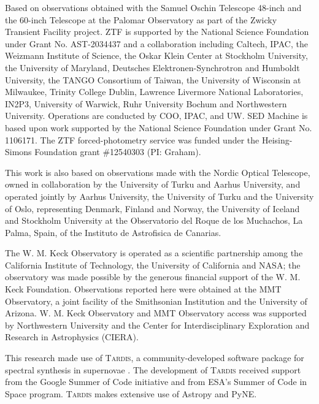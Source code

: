\documentclass[twocolumn]{aastex631}
\begin{document}
\begin{CJK*}{UTF8}{gbsn}
Based on observations obtained with the Samuel Oschin Telescope 48-inch and the 60-inch Telescope at the Palomar Observatory as part of the Zwicky Transient Facility project. ZTF is supported by the National Science Foundation under Grant No. AST-2034437 and a collaboration including Caltech, IPAC, the Weizmann Institute of Science, the Oskar Klein Center at Stockholm University, the University of Maryland, Deutsches Elektronen-Synchrotron and Humboldt University, the TANGO Consortium of Taiwan, the University of Wisconsin at Milwaukee, Trinity College Dublin, Lawrence Livermore National Laboratories, IN2P3, University of Warwick, Ruhr University Bochum and Northwestern University. Operations are conducted by COO, IPAC, and UW.
SED Machine is based upon work supported by the National Science Foundation under Grant No. 1106171. The ZTF forced-photometry service was funded under the Heising-Simons Foundation grant \#12540303 (PI: Graham).

This work is also based on observations made with the Nordic Optical Telescope, owned in collaboration by the University of Turku and Aarhus University, and operated jointly by Aarhus University, the University of Turku and the University of Oslo, representing Denmark, Finland and Norway, the University of Iceland and Stockholm University at the Observatorio del Roque de los Muchachos, La Palma, Spain, of the Instituto de Astrofisica de Canarias.

The W. M. Keck Observatory is operated as a scientific partnership among the California Institute of Technology, the University of California and NASA; the observatory was made possible by the generous financial support of the W. M. Keck Foundation. Observations reported here were obtained at the MMT Observatory, a joint facility of the Smithsonian Institution and the University of Arizona. W. M. Keck Observatory and MMT Observatory access was supported by Northwestern University and the Center for Interdisciplinary Exploration and Research in Astrophysics (CIERA).

This research made use of \textsc{Tardis}, a community-developed software package for spectral synthesis in supernovae \citep{Tardis_2014, tardis-sn_2019}. The development of \textsc{Tardis} received support from the Google Summer of Code initiative and from ESA's Summer of Code in Space program. \textsc{Tardis} makes extensive use of Astropy and PyNE.



\end{CJK*}
\end{document}

